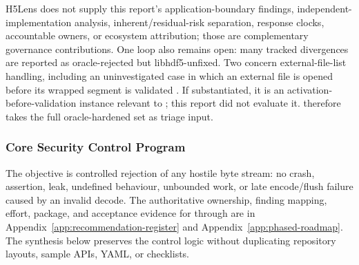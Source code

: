 \documentclass[../main.tex]{subfiles}
\begin{document}
H5Lens does not supply this report's application-boundary findings,
independent-implementation analysis, inherent/residual-risk separation,
response clocks, accountable owners, or ecosystem attribution; those are
complementary governance contributions. One loop also remains open: many
tracked divergences are reported as oracle-rejected but libhdf5-unfixed. Two
concern external-file-list handling, including an uninvestigated case in which
an external file is opened before its wrapped segment is validated
\cite{h5policy-case-efl-open}. If substantiated, it is an
activation-before-validation instance relevant to ; this
report did not evaluate it.  therefore takes the full
oracle-hardened set as triage input.

\subsubsection{Core Security Control Program}

The objective is controlled rejection of any hostile byte stream: no crash,
assertion, leak, undefined behaviour, unbounded work, or late encode/flush
failure caused by an invalid decode. The authoritative ownership, finding
mapping, effort, package, and acceptance evidence for  through
 are in Appendix~\ref{app:recommendation-register} and
Appendix~\ref{app:phased-roadmap}. The synthesis below preserves the control
logic without duplicating repository layouts, sample APIs, YAML, or checklists.
\end{document}
